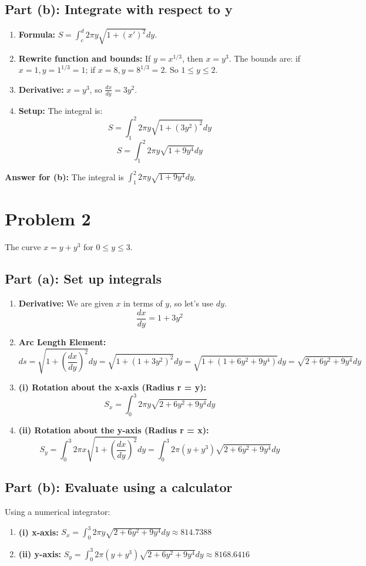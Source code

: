 \documentclass{article}
\begin{document}
\subsection{Part (b): Integrate with respect to y}
\begin{enumerate}
    \item \textbf{Formula:} \(S = \int_{c}^{d} 2\pi y \sqrt{1 + (x')^2} dy\).
    \item \textbf{Rewrite function and bounds:} If \(y = x^{1/3}\), then \(x = y^3\).
    The bounds are: if \(x=1, y=1^{1/3}=1\); if \(x=8, y=8^{1/3}=2\). So \(1 \le y \le 2\).
    \item \textbf{Derivative:} \(x = y^3\), so \(\frac{dx}{dy} = 3y^2\).
    \item \textbf{Setup:} The integral is:
    \[ S = \int_{1}^{2} 2\pi y \sqrt{1 + (3y^2)^2} dy \]
    \[ S = \int_{1}^{2} 2\pi y \sqrt{1 + 9y^4} dy \]
\end{enumerate}
\textbf{Answer for (b):} The integral is \(\int_{1}^{2} 2\pi y \sqrt{1 + 9y^4} dy\).

\section{Problem 2}
The curve \(x = y + y^3\) for \(0 \le y \le 3\).
\subsection{Part (a): Set up integrals}
\begin{enumerate}
    \item \textbf{Derivative:} We are given \(x\) in terms of \(y\), so let's use \(dy\).
    \[ \frac{dx}{dy} = 1 + 3y^2 \]
    \item \textbf{Arc Length Element:}
    \[ ds = \sqrt{1 + \left(\frac{dx}{dy}\right)^2} dy = \sqrt{1 + (1+3y^2)^2} dy = \sqrt{1 + (1 + 6y^2 + 9y^4)} dy = \sqrt{2 + 6y^2 + 9y^4} dy \]
    \item \textbf{(i) Rotation about the x-axis (Radius r = y):}
    \[ S_x = \int_{0}^{3} 2\pi y \sqrt{2 + 6y^2 + 9y^4} dy \]
    \item \textbf{(ii) Rotation about the y-axis (Radius r = x):}
    \[ S_y = \int_{0}^{3} 2\pi x \sqrt{1 + \left(\frac{dx}{dy}\right)^2} dy = \int_{0}^{3} 2\pi (y+y^3) \sqrt{2 + 6y^2 + 9y^4} dy \]
\end{enumerate}

\subsection{Part (b): Evaluate using a calculator}
Using a numerical integrator:
\begin{enumerate}
    \item \textbf{(i) x-axis:} \(S_x = \int_{0}^{3} 2\pi y \sqrt{2 + 6y^2 + 9y^4} dy \approx 814.7388\)
    \item \textbf{(ii) y-axis:} \(S_y = \int_{0}^{3} 2\pi (y+y^3) \sqrt{2 + 6y^2 + 9y^4} dy \approx 8168.6416\)
\end{enumerate}
\end{document}
